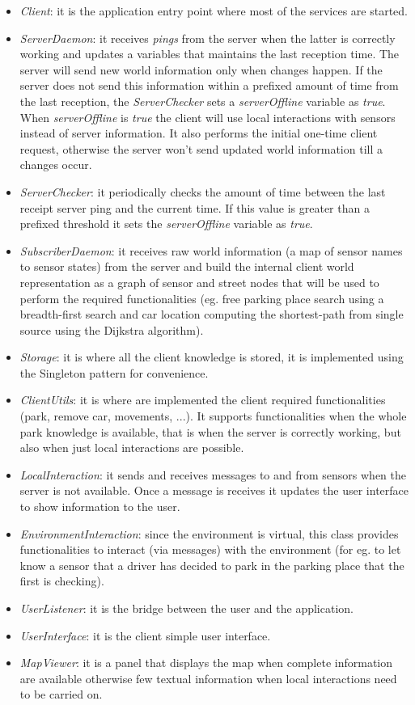 \documentclass[11pt]{article}
\begin{document}
\begin{itemize}
\item \emph{Client}: it is the application entry point where most of the services are started.
\item \emph{ServerDaemon}: it receives \emph{pings} from the server when the latter is correctly working and updates a variables that maintains the last reception time. The server will send new world information only when changes happen. If the server does not send this information within a prefixed amount of time from the last reception, the \emph{ServerChecker} sets a \emph{serverOffline} variable as \emph{true}. When \emph{serverOffline} is \emph{true} the client will use local interactions with sensors instead of server information. It also performs the initial one-time client request, otherwise the server won't send updated world information till a changes occur.
\item \emph{ServerChecker}: it periodically checks the amount of time between the last receipt server ping and the current time. If this value is greater than a prefixed threshold it sets the \emph{serverOffline} variable as \emph{true}.
\item \emph{SubscriberDaemon}: it receives raw world information (a map of sensor names to sensor states) from the server and build the internal client world representation as a graph of sensor and street nodes that will be used to perform the required functionalities (eg. free parking place search using a breadth-first search and car location computing the shortest-path from single source using the Dijkstra algorithm).
\item \emph{Storage}: it is where all the client knowledge is stored, it is implemented using the Singleton pattern for convenience.
\item \emph{ClientUtils}: it is where are implemented the client required functionalities (park, remove car, movements, ...). It supports functionalities when the whole park knowledge is available, that is when the server is correctly working, but also when just local interactions are possible.
\item \emph{LocalInteraction}: it sends and receives messages to and from sensors when the server is not available. Once a message is receives it updates the user interface to show information to the user.
\item \emph{EnvironmentInteraction}: since the environment is virtual, this class provides functionalities to interact (via messages) with the environment (for eg. to let know a sensor that a driver has decided to park in the parking place that the first is checking).
\item \emph{UserListener}: it is the bridge between the user and the application.
\item \emph{UserInterface}: it is the client simple user interface.
\item \emph{MapViewer}: it is a panel that displays the map when complete information are available otherwise few textual information when local interactions need to be carried on.
\end{itemize}
\end{document}
